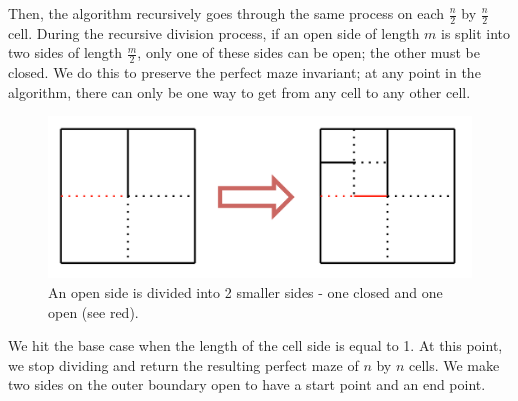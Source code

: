 \documentclass[11pt, margin=1in]{article}
\begin{document}
Then, the algorithm recursively goes through the same process on each $\frac{n}{2}$ by $\frac{n}{2}$ cell.  During the recursive division process, if an open side of length $m$ is split into two sides of length $\frac{m}{2}$, only one of these sides can be open; the other must be closed.  We do this to preserve the perfect maze invariant; at any point in the algorithm, there can only be one way to get from any cell to any other cell.              

\begin{figure}[H]
\begin{center}
\includegraphics[scale=0.7]{gen2.jpg}
\end{center}
\caption{An open side is divided into 2 smaller sides - one closed and one open (see red).}
\end{figure}

We hit the base case when the length of the cell side is equal to 1.  At this point, we stop dividing and return the resulting perfect maze of $n$ by $n$ cells.  We make two sides on the outer boundary open to have a start point and an end point.    
\end{document}
